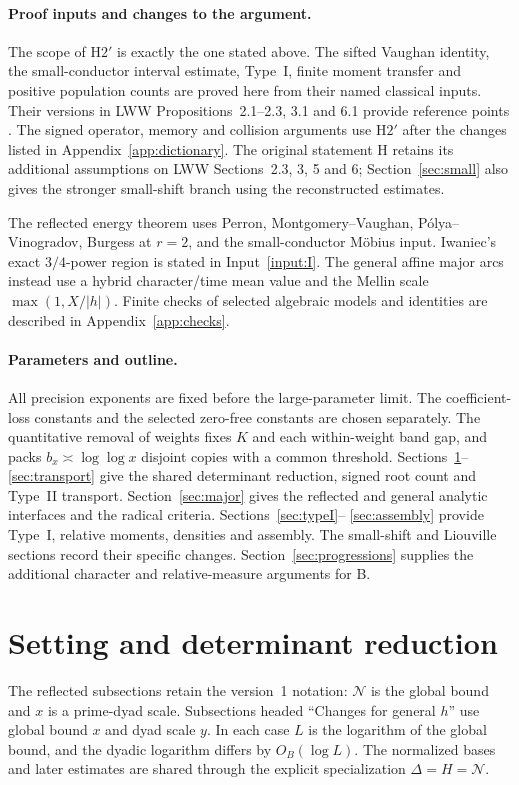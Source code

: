 \documentclass[11pt]{article}
\theoremstyle{definition}
\newcommand{\GN}{\mathcal N}
\newcommand{\LWW}[1]{\cite[#1]{LWW}}
\theoremstyle{remark}
\numberwithin{equation}{section}
\begin{document}
\paragraph{Proof inputs and changes to the argument.}\label{par:lww}
The scope of $\mathrm H2'$ is exactly the one stated above.
The sifted Vaughan identity, the small-conductor interval estimate,
Type~I, finite moment transfer and positive population counts are
proved here from their named classical inputs. Their versions in
LWW Propositions~2.1--2.3, 3.1 and 6.1 provide reference points
\LWW{pp.~4--14, 46--47}. The signed operator, memory and collision
arguments use $\mathrm H2'$ after the changes listed in
Appendix~\ref{app:dictionary}. The original statement H retains its
additional assumptions on LWW Sections~2.3, 3, 5 and 6;
Section~\ref{sec:small} also gives the stronger small-shift branch
using the reconstructed estimates.

The reflected energy theorem uses Perron, Montgomery--Vaughan,
P\'olya--Vinogradov, Burgess at $r=2$, and the small-conductor
M\"obius input. Iwaniec's exact $3/4$-power region is stated in
Input~\ref{input:I}. The general affine major arcs instead use a
hybrid character/time mean value and the Mellin scale
$\max(1,X/|h|)$. Finite checks of selected algebraic models and identities are
described in Appendix~\ref{app:checks}.

\paragraph{Parameters and outline.}
All precision exponents are fixed before the large-parameter limit.
The coefficient-loss constants and the selected zero-free constants
are chosen separately. The quantitative removal of weights fixes
$K$ and each within-weight band gap, and packs
$b_x\asymp\log\log x$ disjoint copies with a common threshold.
Sections~\ref{sec:setting}--\ref{sec:transport} give the shared
determinant reduction, signed root count and Type~II transport.
Section~\ref{sec:major} gives the reflected and general analytic
interfaces and the radical criteria. Sections~\ref{sec:typeI}--
\ref{sec:assembly} provide Type~I, relative moments, densities and
assembly. The small-shift and Liouville sections record their
specific changes. Section~\ref{sec:progressions} supplies the
additional character and relative-measure arguments for B.

\section{Setting and determinant reduction}\label{sec:setting}
The reflected subsections retain the version~1 notation: $\GN$
is the global bound and $x$ is a prime-dyad scale. Subsections
headed ``Changes for general $h$'' use global bound $x$ and
dyad scale $y$. In each case $L$ is the logarithm of the global
bound, and the dyadic logarithm differs by $O_B(\log L)$.
The normalized bases and later estimates are shared through the
explicit specialization $\Delta=H=\GN$.
\end{document}
